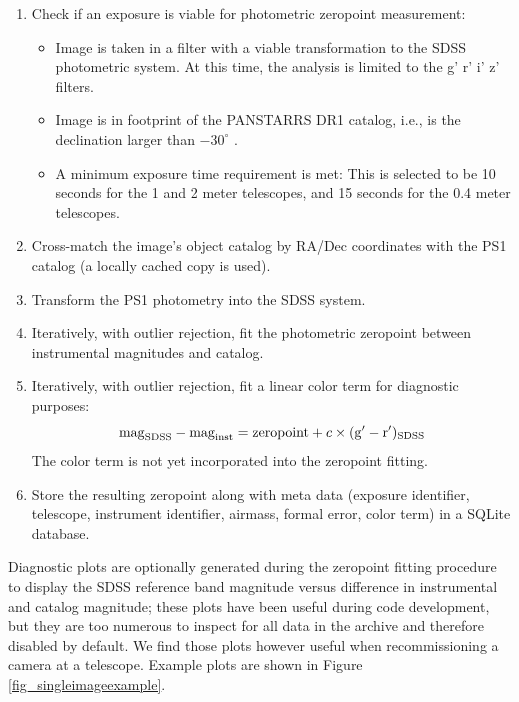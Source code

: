 \documentclass[]{spieman}
\begin{document}
 
\begin{enumerate} 
    \item Check if an exposure is viable for photometric zeropoint measurement:
   
    \begin{itemize} 
        \item Image is taken in a filter with a viable transformation to the SDSS
        photometric system. At this time, the analysis is limited to the g' r' i' z' filters. 
        
        \item Image is in footprint of the PANSTARRS DR1 catalog, i.e., is the declination larger
         than $-30^\circ$ . 
        
        \item A minimum exposure time requirement is met: This is selected to be 10 seconds for the
         1 and 2 meter telescopes, and 15 seconds for the 0.4 meter telescopes. 
        
    \end{itemize}
    
    \item Cross-match the image's object catalog by RA/Dec coordinates with the PS1 catalog (a 
    locally cached copy is used). 
    
    \item Transform the PS1 photometry into the SDSS system\cite{finkbeiner2016}.
    
    \item Iteratively, with outlier rejection, fit the photometric zeropoint between instrumental
    magnitudes and catalog. \item Iteratively, with outlier rejection, fit a linear color term for
    diagnostic purposes: $$ {\rm mag}_{\rm SDSS} - {\rm mag}_{\rm inst} = {\rm zeropoint} + c \times
    ({\rm g'}-{ \rm r'})_{\rm SDSS}$$ The color term is not yet incorporated into the zeropoint
    fitting. \item Store the resulting zeropoint along with meta data (exposure identifier, 
    telescope, instrument identifier, airmass, formal error, color term) in a SQLite database. 
\end{enumerate}

Diagnostic plots are optionally generated during the zeropoint fitting procedure to display the
SDSS reference band magnitude versus difference in instrumental and catalog magnitude; these plots
have been useful during code development, but they are too numerous to inspect for all data in the
archive and therefore disabled by default. We find those plots however useful when recommissioning a
camera at a telescope. Example plots are shown in Figure \ref{fig_singleimageexample}.
\end{document}
